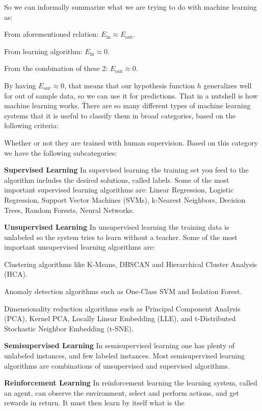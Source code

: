 So we can informally summarize what we are trying to do with machine learning as:
\bit
\item From aforementioned relation: $E_{\text{in}} \approx E_{\text{out}}$.
\item From learning algorithm: $E_{\text{in}} \approx 0$.
\item From the combination of these 2: $E_{\text{out}} \approx 0$.
\eit

By having $E_{\text{out}} \approx 0$, that means that our hypothesis function $h$ generalizes well for out of sample
data, so we can use it for predictions. That in a nutshell is how machine learning works. \v

There are so many different types of machine learning systems that it is useful to classify them in broad categories,
based on the following criteria:
\ben
\item Whether or not they are trained with human supervision. Based on this category we have the following
subcategories:
\bit
\item \textbf{Supervised Learning} In supervised learning the training set you feed to the algorithm includes the
desired solutions, called labels. Some of the most important supervised learning algorithms are: Linear Regression,
Logistic Regression, Support Vector Machines (SVMs), k-Nearest Neighbors, Decision Trees, Random Forests, Neural
Networks.
\item \textbf{Unsupervised Learning} In unsupervised learning the training data is unlabeled so the system tries to
learn without a teacher. Some of the most important unsupervised learning algorithms are:
\bit
\item Clustering algorithms like K-Means, DBSCAN and Hierarchical Cluster Analysis (HCA).
\item Anomaly detection algorithms such as One-Class SVM and Isolation Forest.
\item Dimensionality reduction algorithms such as Principal Component Analysis (PCA), Kernel PCA, Locally Linear
Embedding (LLE), and t-Distributed Stochastic Neighbor Embedding (t-SNE).
\eit
\item \textbf{Semisupervised Learning} In semisupervised learning one has plenty of unlabeled instances, and few
labeled instances. Most semisupervised learning algorithms are combinations of unsupervised and supervised algorithms.
\item \textbf{Reinforcement Learning} In reinforcement learning the learning system, called an agent, can observe
the environment, select and perform actions, and get rewards in return. It must then learn by itself what is the

